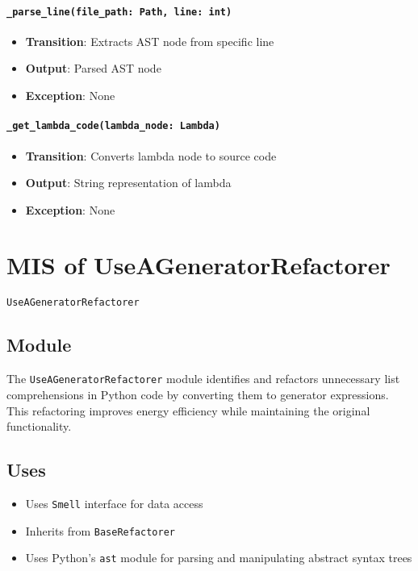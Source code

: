 \documentclass[12pt, titlepage]{article}
\begin{document}
\paragraph{\texttt{\_parse\_line(file\_path: Path, line: int)}}
\begin{itemize}
  \item \textbf{Transition}: Extracts AST node from specific line
  \item \textbf{Output}: Parsed AST node
  \item \textbf{Exception}: None
\end{itemize}

\paragraph{\texttt{\_get\_lambda\_code(lambda\_node: Lambda)}}
\begin{itemize}
  \item \textbf{Transition}: Converts lambda node to source code
  \item \textbf{Output}: String representation of lambda
  \item \textbf{Exception}: None
\end{itemize}

\section{MIS of UseAGeneratorRefactorer} \label{mis:UseGen}

\texttt{UseAGeneratorRefactorer}

\subsection{Module}

The \texttt{UseAGeneratorRefactorer} module identifies and refactors 
unnecessary list comprehensions in Python code by converting them to generator expressions. This refactoring improves energy efficiency while maintaining the original functionality.

\subsection{Uses}
\begin{itemize}
\item Uses \texttt{Smell} interface for data access
\item Inherits from \texttt{BaseRefactorer}
\item Uses Python's \texttt{ast} module for parsing and manipulating abstract syntax trees
\end{itemize}
\end{document}
